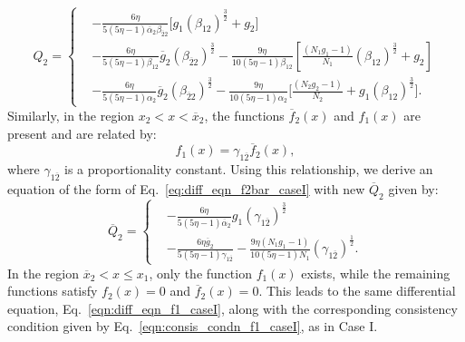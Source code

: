 \documentclass[preprint,12pt]{elsarticle}
\begin{document}
            \begin{equation}
                Q_{2}  =  \left\{ \begin{aligned}
                            &  - \frac{6 \eta}{5 (5\eta -1)\overline{\alpha}_{2} \beta_{\overline{2}2}} \biggl[ g_{1} (\beta_{12})^\frac{3}{2} + g_{2} \biggr] \\ & 
                             - \frac{6 \eta}{5 (5 \eta -1) \beta_{12}} \overline{g}_{2} (\beta_{\overline{2}2})^\frac{3}{2} - \frac{9 \eta}{10 (5\eta-1) \beta_{12}} \left[ \frac{(N_{1}g_{1} -1)}{N_{1}}(\beta_{12})^\frac{3}{2} + g_{2} \right] \\ &
                             - \frac{6 \eta}{5 (5 \eta -1) \alpha_{2}} \overline{g}_{2} (\beta_{\overline{2}2})^\frac{3}{2} - \frac{9 \eta}{10 (5 \eta -1 ) \alpha_{2}} \biggl[ \frac{(N_{2}g_{2} -1)}{N_{2}} + g_{1} (\beta_{12})^\frac{3}{2} \biggr].
                        \end{aligned}
                \right.
                \label{eqn:consis_condn_f2_caseII}
            \end{equation}
            Similarly, in the region $x_2 < x < \overline{x}_{2}$, the functions $\overline{f}_{2}(x)$ and $f_1(x)$ are present and are related by:  
            \[
            f_1(x) = \gamma_{1\overline{2}} \overline{f}_{2}(x),
            \]  
            where $\gamma_{1\overline{2}}$ is a proportionality constant. Using this relationship, we derive an equation of the form of Eq.~\eqref{eq:diff_eqn_f2bar_caseI} with new $\overline{Q}_2$ given by: 
            \begin{equation}
                \overline{Q}_{2} = \left\{ 
                \begin{aligned}
                    &  - \frac{6 \eta}{5 (5 \eta -1) \overline{\alpha}_{2}} g_{1} (\gamma_{1\overline{2}})^\frac{3}{2}\\ 
                    &   -\frac{6\eta \overline{g}_{2}}{5(5\eta-1) \gamma_{1\overline{2}}} - \frac{9 \eta (N_{1}g_{1} -1)}{10 (5\eta -1)N_{1}} (\gamma_{1\overline{2}})^\frac{1}{2}.
                \end{aligned}
                \right. \label{eqn:consis_condn_f2bar_caseII}
            \end{equation}
            In the region $\overline{x}_{2} < x \leq x_1$, only the function $f_1(x)$ exists, while the remaining functions satisfy $f_2(x) = 0$ and $\overline{f}_{2}(x) = 0$. This leads to the same differential equation, Eq.~\eqref{eqn:diff_eqn_f1_caseI}, along with the corresponding consistency condition given by Eq.~\eqref{eqn:consis_condn_f1_caseI}, as in Case I.
\end{document}
